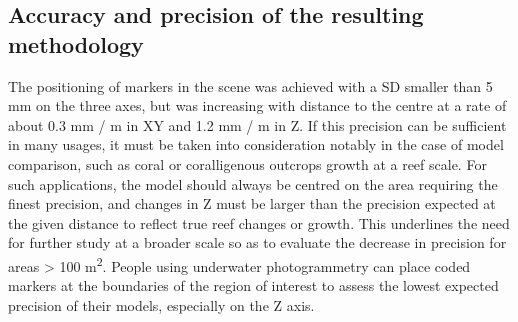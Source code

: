 \subsection{Accuracy and precision of the resulting methodology}\label{chapitre2_4.2}
The positioning of markers in the scene was achieved with a SD smaller than 5 mm on the three axes, but was increasing with distance to the centre at a rate of about 0.3 mm / m in XY and 1.2 mm / m in Z. If this precision can be sufficient in many usages, it must be taken into consideration notably in the case of model comparison, such as coral or coralligenous outcrops growth at a reef scale. For such applications, the model should always be centred on the area requiring the finest precision, and changes in Z must be larger than the precision expected at the given distance to reflect true reef changes or growth. This underlines the need for further study at a broader scale so as to evaluate the decrease in precision for areas > 100 m\textsuperscript{2}. People using underwater photogrammetry can place coded markers at the boundaries of the region of interest to assess the lowest expected precision of their models, especially on the Z axis.

